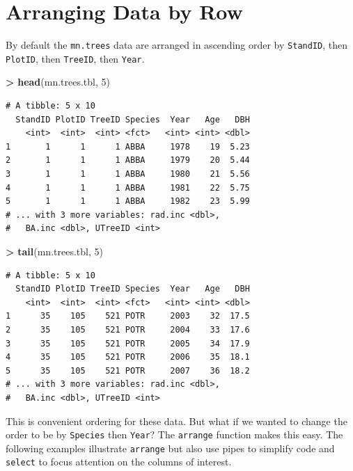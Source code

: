 \documentclass[]{krantz}
\makeatletter
\newenvironment{Shaded}{\begin{snugshade}}{\end{snugshade}}
\newcommand{\DecValTok}[1]{\textcolor[rgb]{0.06,0.06,0.06}{#1}}
\newcommand{\KeywordTok}[1]{\textcolor[rgb]{0.27,0.27,0.27}{\textbf{#1}}}
\newcommand{\NormalTok}[1]{#1}
\newcommand{\OperatorTok}[1]{\textcolor[rgb]{0.43,0.43,0.43}{\textbf{#1}}}
\newcommand{\StringTok}[1]{\textcolor[rgb]{0.5,0.5,0.5}{#1}}
\newenvironment{kframe}{%
\medskip{}
\setlength{\fboxsep}{.8em}
 \def\at@end@of@kframe{}%
 \ifinner\ifhmode%
  \def\at@end@of@kframe{\end{minipage}}%
  \begin{minipage}{\columnwidth}%
 \fi\fi%
 \def\FrameCommand##1{\hskip\@totalleftmargin \hskip-\fboxsep
 \colorbox{shadecolor}{##1}\hskip-\fboxsep
     \hskip-\linewidth \hskip-\@totalleftmargin \hskip\columnwidth}%
 \MakeFramed {\advance\hsize-\width
   \@totalleftmargin\z@ \linewidth\hsize
   \@setminipage}}%
 {\par\unskip\endMakeFramed%
 \at@end@of@kframe}
\renewenvironment{Shaded}{\begin{kframe}}{\end{kframe}}
\makeatother
\begin{document}
\hypertarget{arranging-data-by-row}{%
\section{Arranging Data by Row}\label{arranging-data-by-row}}

By default the \texttt{mn.trees} data are arranged in ascending order by \texttt{StandID}, then \texttt{PlotID}, then \texttt{TreeID}, then \texttt{Year}.

\begin{Shaded}
\begin{Highlighting}[]
\OperatorTok{>}\StringTok{ }\KeywordTok{head}\NormalTok{(mn.trees.tbl, }\DecValTok{5}\NormalTok{)}
\end{Highlighting}
\end{Shaded}

\begin{verbatim}
# A tibble: 5 x 10
  StandID PlotID TreeID Species  Year   Age   DBH
    <int>  <int>  <int> <fct>   <int> <int> <dbl>
1       1      1      1 ABBA     1978    19  5.23
2       1      1      1 ABBA     1979    20  5.44
3       1      1      1 ABBA     1980    21  5.56
4       1      1      1 ABBA     1981    22  5.75
5       1      1      1 ABBA     1982    23  5.99
# ... with 3 more variables: rad.inc <dbl>,
#   BA.inc <dbl>, UTreeID <int>
\end{verbatim}

\begin{Shaded}
\begin{Highlighting}[]
\OperatorTok{>}\StringTok{ }\KeywordTok{tail}\NormalTok{(mn.trees.tbl, }\DecValTok{5}\NormalTok{)}
\end{Highlighting}
\end{Shaded}

\begin{verbatim}
# A tibble: 5 x 10
  StandID PlotID TreeID Species  Year   Age   DBH
    <int>  <int>  <int> <fct>   <int> <int> <dbl>
1      35    105    521 POTR     2003    32  17.5
2      35    105    521 POTR     2004    33  17.6
3      35    105    521 POTR     2005    34  17.9
4      35    105    521 POTR     2006    35  18.1
5      35    105    521 POTR     2007    36  18.2
# ... with 3 more variables: rad.inc <dbl>,
#   BA.inc <dbl>, UTreeID <int>
\end{verbatim}

This is convenient ordering for these data. But what if we wanted to change the order to be by \texttt{Species} then \texttt{Year}? The \texttt{arrange} function makes this easy. The following examples illustrate \texttt{arrange} but also use pipes to simplify code and \texttt{select} to focus attention on the columns of interest.
\end{document}
